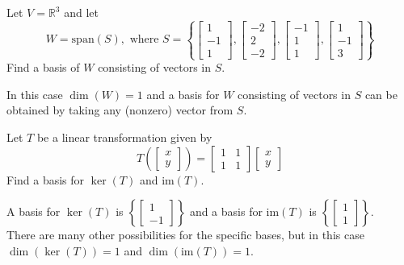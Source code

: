 \documentclass{ximera}
\begin{document}
\begin{problem}\label{prb:10.86}
Let $V=\mathbb{R}^{3}$ and let
\begin{equation*}
W=\mbox{span} \left( S \right),  \mbox{ where } S=\left\{ \left[
\begin{array}{r}
1 \\
-1 \\
1
\end{array}
\right] ,\left[
\begin{array}{r}
-2 \\
2 \\
-2
\end{array}
\right],\left[
\begin{array}{r}
-1 \\
1 \\
1
\end{array}
\right],\left[
\begin{array}{r}
1 \\
-1 \\
3
\end{array}
\right] \right\}
\end{equation*}
Find a basis of $W$ consisting of vectors in $S$.

\begin{hint}
In this case $\dim (W)=1$ and a basis for $W$ consisting of vectors in $S$ can be obtained by taking any (nonzero) vector from $S$.
\end{hint}
\end{problem}


\begin{problem}\label{prb:10.87}
 Let $T$ be a linear transformation given by
\[
T\left( \left[ \begin{array}{r}
x\\
y
\end{array}\right]\right) = \left[ \begin{array}{rrr}
1 &1  \\
1 & 1
\end{array}\right]
\left[ \begin{array}{r}
x\\
y
\end{array}\right]
\]
Find a basis for $\ker \left( T\right)$ and $\mbox{im} \left( T\right) $.

\begin{hint}
A basis for $\ker \left( T\right)$ is
$\left\{ \left[
\begin{array}{r}
1 \\
-1
\end{array}
\right] \right\}$
and a basis for $\mbox{im} \left( T\right)$ is
$\left\{ \left[
\begin{array}{r}
1 \\
1
\end{array}
\right] \right\}$. \\
There are many other possibilities for the specific bases, but in this case
$\dim \left( \ker \left( T\right) \right)=1 $ and $\dim \left( \mbox{im} \left( T\right) \right)=1$.
\end{hint}

\end{problem}
\end{document}
